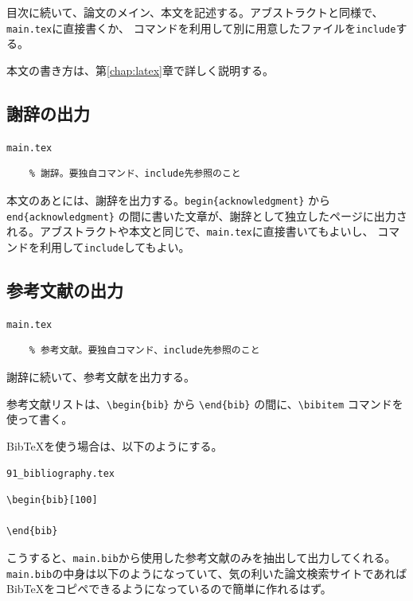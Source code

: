 目次に続いて、論文のメイン、本文を記述する。アブストラクトと同様で、{\tt main.tex}に直接書くか、\verb|| コマンドを利用して別に用意したファイルを{\tt include}する。

本文の書き方は、第\ref{chap:latex}章で詳しく説明する。


\subsection{謝辞の出力}

\begin{itembox}[l]{{\tt main.tex}}
\begin{verbatim}
	% 謝辞。要独自コマンド、include先参照のこと
\end{verbatim}
\end{itembox}

本文のあとには、謝辞を出力する。\verb|begin{acknowledgment}| から \verb|end{acknowledgment}| の間に書いた文章が、謝辞として独立したページに出力される。アブストラクトや本文と同じで、{\tt main.tex}に直接書いてもよいし、\verb|| コマンドを利用して{\tt include}してもよい。


\subsection{参考文献の出力}

\begin{itembox}[l]{{\tt main.tex}}
\begin{verbatim}
	% 参考文献。要独自コマンド、include先参照のこと
\end{verbatim}
\end{itembox}

謝辞に続いて、参考文献を出力する。

参考文献リストは、\verb|\begin{bib}| から \verb|\end{bib}| の間に、\verb|\bibitem| コマンドを使って書く。

BibTeXを使う場合は、以下のようにする。

\begin{itembox}[l]{{\tt 91\_bibliography.tex}}
\begin{verbatim}
\begin{bib}[100]

\end{bib}
\end{verbatim}
\end{itembox}

こうすると、\verb|main.bib|から使用した参考文献のみを抽出して出力してくれる。\verb|main.bib|の中身は以下のようになっていて、気の利いた論文検索サイトであればBibTeXをコピペできるようになっているので簡単に作れるはず。



